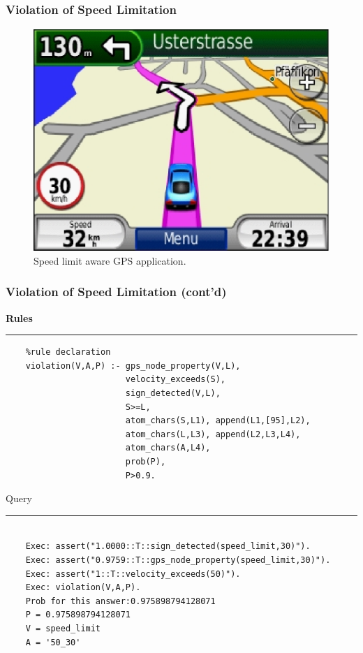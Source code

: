 \documentclass{beamer}
\newenvironment{mylisting}
{\begin{list}{}{\setlength{\leftmargin}{1em}}\item\scriptsize\bfseries}
{\end{list}}
\begin{document}
\begin{frame}[fragile]
	\frametitle{Violation of Speed Limitation }
	\begin{figure}[ht]
	\begin{center}
	\includegraphics[width=.5\paperwidth]{../img/gpsspeed.eps}
	\caption{Speed limit aware GPS application.}
	\label{fig:gpsspeed}
	\end{center}
	\end{figure}
\end{frame}

\begin{frame}[fragile]
	\frametitle{Violation of Speed Limitation (cont'd)}
	\begin{mylisting}
	Rules
	\vspace*{2px}\hrule
	\begin{verbatim}
	%rule declaration
	violation(V,A,P) :- gps_node_property(V,L),
	                    velocity_exceeds(S),
	                    sign_detected(V,L),
	                    S>=L,
	                    atom_chars(S,L1), append(L1,[95],L2), 
	                    atom_chars(L,L3), append(L2,L3,L4), 
	                    atom_chars(A,L4),
	                    prob(P),
	                    P>0.9.
	\end{verbatim}
	
	Query
	\vspace*{2px}\hrule
	\begin{verbatim}
	
	Exec: assert("1.0000::T::sign_detected(speed_limit,30)").
	Exec: assert("0.9759::T::gps_node_property(speed_limit,30)").
	Exec: assert("1::T::velocity_exceeds(50)").
	Exec: violation(V,A,P).
	Prob for this answer:0.975898794128071
	P = 0.975898794128071
	V = speed_limit
	A = '50_30'
	
	\end{verbatim}
	\end{mylisting}	
\end{frame}
\end{document}
